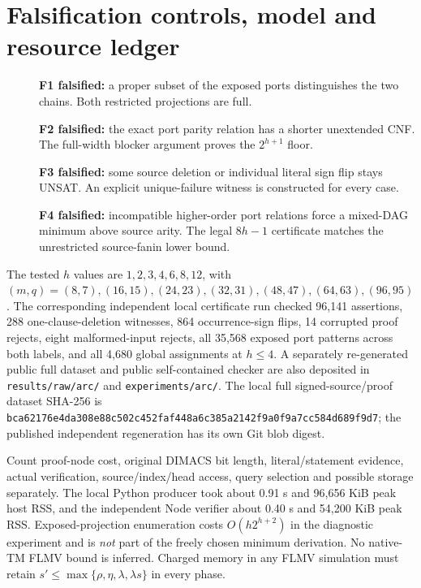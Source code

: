 \documentclass[11pt]{article}
\begin{document}
\section*{Falsification controls, model and resource ledger}
\begin{description}
\item[] \textbf{F1 falsified:} a proper subset of the exposed ports distinguishes the two chains. Both restricted projections are full.
\item[] \textbf{F2 falsified:} the exact port parity relation has a shorter unextended CNF. The full-width blocker argument proves the $2^{h+1}$ floor.
\item[] \textbf{F3 falsified:} some source deletion or individual literal sign flip stays UNSAT. An explicit unique-failure witness is constructed for every case.
\item[] \textbf{F4 falsified:} incompatible higher-order port relations force a mixed-DAG minimum above source arity. The legal $8h-1$ certificate matches the unrestricted source-fanin lower bound.
\end{description}
The tested $h$ values are $1,2,3,4,6,8,12$, with $(m,q)=(8,7),(16,15),(24,23),(32,31),(48,47),(64,63),(96,95)$. The corresponding independent local certificate run checked 96,141 assertions, 288 one-clause-deletion witnesses, 864 occurrence-sign flips, 14 corrupted proof rejects, eight malformed-input rejects, all 35,568 exposed port patterns across both labels, and all 4,680 global assignments at $h\le4$. A separately re-generated public full dataset and public self-contained checker are also deposited in \texttt{results/raw/arc/} and \texttt{experiments/arc/}. The local full signed-source/proof dataset SHA-256 is \texttt{bca62176e4da308e88c502c452faf448a6c385a2142f9a0f9a7cc584d689f9d7}; the published independent regeneration has its own Git blob digest.

Count proof-node cost, original DIMACS bit length, literal/statement evidence, actual verification, source/index/head access, query selection and possible storage separately. The local Python producer took about 0.91 s and 96,656 KiB peak host RSS, and the independent Node verifier about 0.40 s and 54,200 KiB peak RSS. Exposed-projection enumeration costs $O(h2^{h+2})$ in the diagnostic experiment and is \emph{not} part of the freely chosen minimum derivation. No native-TM FLMV bound is inferred. Charged memory in any FLMV simulation must retain $s'\le\max\{\rho,\eta,\lambda,\lambda s\}$ in every phase.
\end{document}
